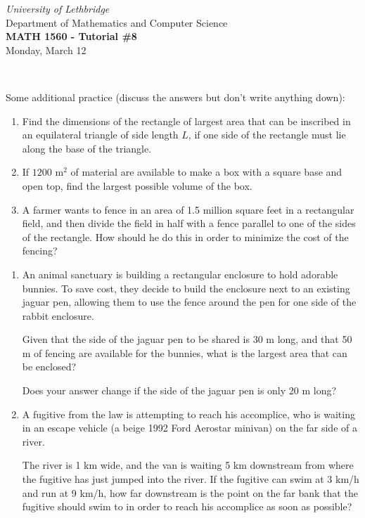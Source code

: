 \documentclass[12pt]{article}
\newcommand{\skipline}{\vspace{12pt}}
\begin{document}
\author{Instructor: Sean Fitzpatrick}
\thispagestyle{empty}
\begin{center}
\emph{University of Lethbridge}\\
Department of Mathematics and Computer Science\\
{\bf MATH 1560 - Tutorial \#8}\\
Monday, March 12
\end{center}
\skipline \ \noindent \skipline

\vspace*{\fill}


Some additional practice (discuss the answers but don't write anything down):
\begin{enumerate}
\item Find the dimensions of the rectangle of largest area that can be inscribed in an equilateral triangle of side length $L$, if one side of the rectangle must lie along  the base of the triangle.
\item If $1200 \text{ m}^2$ of material are available to make a box with a square base and open top, find the largest possible volume of the box.
\item A farmer wants to fence in an area of 1.5 million square feet in a rectangular field, and then divide the field in half with a fence parallel to one of the sides of the rectangle. How should he do this in order to minimize the cost of the fencing?
\end{enumerate}




\newpage


\begin{enumerate}
\item An animal sanctuary is building a rectangular enclosure to hold adorable bunnies. To save cost, they decide to build the enclosure next to an existing jaguar pen, allowing them to use the fence around the pen for one side of the rabbit enclosure.

Given that the side of the jaguar pen to be shared is 30 m long, and that 50 m of fencing are available for the bunnies, what is the largest area that can be enclosed?

Does your answer change if the side of the jaguar pen is only 20 m long?

\vspace{3in}

\item A fugitive from the law is attempting to reach his accomplice, who is waiting in an escape vehicle (a beige 1992 Ford Aerostar minivan) on the far side of a river.

The river is 1 km wide, and the van is waiting 5 km downstream from where the fugitive has just jumped into the river. If the fugitive can swim at 3 km/h and run at 9 km/h, how far downstream is the point on the far bank that the fugitive should swim to in order to reach his accomplice as soon as possible?
\end{enumerate}
\newpage
\end{document}
